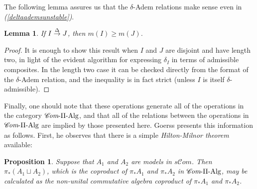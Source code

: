 \documentclass[11pt]{amsart}
\theoremstyle{plain}
\newtheorem{lem}[thm]{Lemma}
\newtheorem{prop}[thm]{Proposition}
\theoremstyle{definition}
\renewcommand{\to}{\longrightarrow}
\newcommand{\scrC}{\mathscr{C}}
\theoremstyle{plain}
\newcommand{\deltaalg}{\Delta} %
\newcommand{\PiAlg}{\textup{-$\Pi$-Alg}}
\newcommand{\minDimDelta}{m}
\newcommand{\produces}[3]{#3:#1\sim #2}
\renewcommand{\produces}[3]{#1\rightarrow_{#3} #2}%
\renewcommand{\produces}[3]{#1\overset{\smash{#3}}{\rightarrow} #2}%
\newcommand{\algs}{{\scrC\!\textit{om}}}
\begin{document}
\begin{Constructing (co)homotopy operations}
The following lemma assures us that the $\delta$-Adem relations make sense even in \emph{(\ref{deltaademsunstable})}.
\begin{lem}\label{lemOnAdemChangeInMDeltaPlain}
If $\produces{I}{J}{\deltaalg}$, then $\minDimDelta(I)\geq\minDimDelta(J)$.
\end{lem}
\begin{proof}
It is enough to show this result when $I$ and $J$ are disjoint and have length two, in light of the evident algorithm for expressing $\delta_I$ in terms of admissible composites. In the length two case it can be checked directly from the format of the $\delta$-Adem relation, and the inequality is in fact strict (unless $I$ is itself $\delta$-admissible).
\end{proof}
Finally, one should note that these operations generate all of the operations in the category $\algs\PiAlg$, and that all of the relations between the operations in $\algs\PiAlg$ are implied by those presented here. Goerss \cite[\S2]{MR1089001} presents this information as follows. First, he observes that there is a simple \emph{Hilton-Milnor theorem} available:
\begin{prop}
Suppose that $A_1$ and $A_2$ are models in $s\algs$. Then $\pi_*(A_1\sqcup A_2)$, which is the coproduct of $\pi_*A_1$ and $\pi_*A_2$ in $\algs\PiAlg$, may be calculated as the non-unital commutative algebra coproduct of $\pi_*A_1$ and $\pi_*A_2$.
\end{prop}

\end{Constructing (co)homotopy operations}
\end{document}
